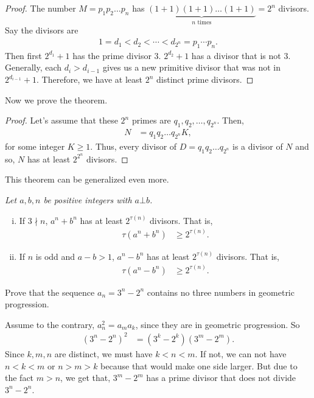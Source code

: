 \documentclass{subfile}
\begin{document}
		\begin{proof}
			The number $M=p_1p_2\dots p_n$ has $\underbrace{(1+1)(1+1)\dots(1+1)}_{n\text{ times}}=2^n$ divisors. Say the divisors are
				\begin{align*}
					1=d_1<d_2<\cdots<d_{2^n}=p_1\cdots p_n.
				\end{align*}
			Then first $2^{d_1}+1$ has the prime divisor $3$. $2^{d_2}+1$ has a divisor that is not $3$. Generally, each $d_i>d_{i-1}$ gives us a new primitive divisor that was not in $2^{d_{i-1}}+1$. Therefore, we have at least $2^n$ distinct prime divisors.
		\end{proof}
	Now we prove the theorem.
		\begin{proof}
			Let's assume that these $2^n$ primes are $q_1, q_2, \dots, q_{2^n}$. Then,
				\begin{align*}
					N & = q_1q_2\dots q_{2^n}K,
				\end{align*}
			for some integer $K\geq1$. Thus, every divisor of $D=q_1q_2\dots q_{2^n}$ is a divisor of $N$ and so, $N$ has at least $2^{2^n}$ divisors.
		\end{proof}
	This theorem can be generalized even more.
		\begin{theorem}\slshape
			Let $a,b,n$ be positive integers with $a\bot b$.
				\begin{enumerate}[i.]
					\item If $3\nmid n$, $a^n+b^n$ has at least $2^{\tau(n)}$ divisors. That is,
						\begin{align*}
							\tau(a^n+b^n) &\geq2^{\tau(n)}.
						\end{align*}
					\item If $n$ is odd and $a-b>1$, $a^n-b^n$ has at least $2^{\tau(n)}$ divisors. That is,
						\begin{align*}
							\tau(a^n-b^n) & \geq2^{\tau(n)}.
						\end{align*}
				\end{enumerate}
		\end{theorem}

		\begin{problem}
			Prove that the sequence $a_n = 3^n - 2^n$ contains no three numbers in geometric progression.
		\end{problem}

		\begin{solution}
			Assume to the contrary, $a_n^2=a_ma_k$, since they are in geometric progression. So
				\begin{align*}
					(3^n-2^n)^2 & = (3^k-2^k)(3^m-2^m).
				\end{align*}
			Since $k,m,n$ are distinct, we must have $k<n<m$. If not, we can not have $n<k<m$ or $n>m>k$ because that would make one side larger. But due to the fact $m>n$, we get that, $3^m-2^m$ has a prime divisor that does not divide $3^n-2^n$.
		\end{solution}
\end{document}
